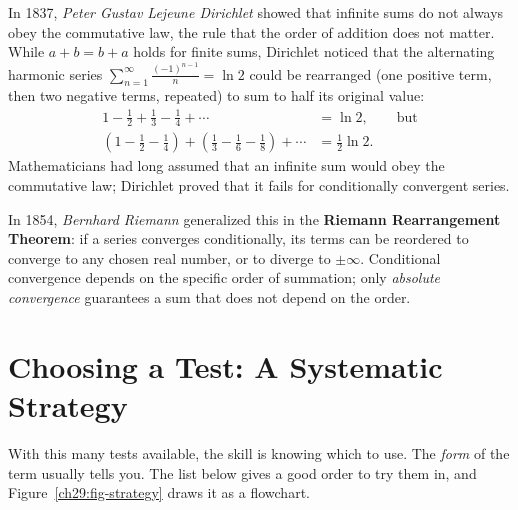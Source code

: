 \begin{connectionbox}
In 1837, \emph{Peter Gustav Lejeune Dirichlet} showed that infinite sums do not always obey the commutative law, the rule that the order of addition does not matter. While $a+b=b+a$ holds for finite sums, Dirichlet noticed that the alternating harmonic series $\sum_{n=1}^\infty \frac{(-1)^{n-1}}{n} = \ln 2$ could be rearranged (one positive term, then two negative terms, repeated) to sum to half its original value:
\begin{align*}
  1 - \frac12 + \frac13 - \frac14 + \cdots &= \ln 2, \qquad \text{but}\\
  \left(1 - \frac12 - \frac14\right) + \left(\frac13 - \frac16 - \frac18\right) + \cdots &= \frac12 \ln 2.
\end{align*}
Mathematicians had long assumed that an infinite sum would obey the commutative law; Dirichlet proved that it fails for conditionally convergent series.

In 1854, \emph{Bernhard Riemann} generalized this in the \textbf{Riemann Rearrangement Theorem}: if a series converges conditionally, its terms can be reordered to converge to any chosen real number, or to diverge to $\pm\infty$. Conditional convergence depends on the specific order of summation; only \emph{absolute convergence} guarantees a sum that does not depend on the order.
\end{connectionbox}

\section{Choosing a Test: A Systematic Strategy}
\label{ch29:strategy}

With this many tests available, the skill is knowing which to use. The \emph{form} of the term usually tells you. The list below gives a good order to try them in, and Figure~\ref{ch29:fig-strategy} draws it as a flowchart.

